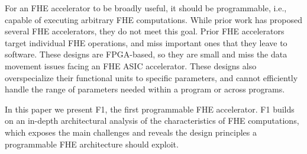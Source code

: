 For an FHE accelerator to be broadly useful, it should be programmable, i.e., capable of executing arbitrary FHE computations.
While prior work has proposed several FHE accelerators, they do not meet this goal.
Prior FHE accelerators~\cite{cousins:hpec14:fpga-he,cousins:tetc17:fpga-he,doroz:tc15:accelerating-fhe,roy:hpca19:fpga-he,riazi:asplos20:heax,turan:tc20:heaws} target individual FHE operations,
and miss important ones that they leave to software.
These designs are FPGA-based, so they are small and 
miss the data movement issues facing an FHE ASIC accelerator.
These designs also overspecialize their functional units to specific parameters,
and cannot efficiently handle the range of parameters needed within a program or across programs.
%

In this paper we present F1, the first programmable FHE accelerator.
F1 builds on an in-depth architectural analysis of the characteristics of FHE computations, which exposes the main challenges and reveals the design principles a programmable FHE architecture should exploit.


